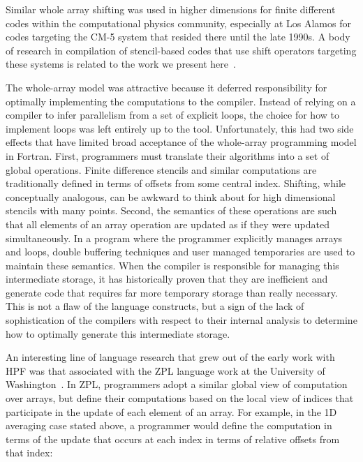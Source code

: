 Similar whole array shifting was used in higher dimensions for finite
different codes within the computational physics community, especially
at Los Alamos for codes targeting the CM-5 system that resided there until the
late 1990s.  A body of research in compilation of stencil-based codes
that use shift operators targeting these systems is related to the
work we present here~\cite{stencil-compiler}.

The whole-array model was attractive because it deferred
responsibility for optimally implementing the computations to the
compiler.  Instead of relying on a compiler to infer parallelism from
a set of explicit loops, the choice for how to implement loops was
left entirely up to the tool.  Unfortunately, this had two side
effects that have limited broad acceptance of the whole-array
programming model in Fortran.  First, programmers must translate their
algorithms into a set of global operations.  Finite difference
stencils and similar computations are traditionally defined in terms
of offsets from some central index.  Shifting, while conceptually
analogous, can be awkward to think about for high dimensional stencils
with many points.  Second, the semantics of these operations are such
that all elements of an array operation are updated as if they were
updated simultaneously.  In a program where the programmer explicitly
manages arrays and loops, double buffering techniques and user managed
temporaries are used to maintain these semantics.  When the compiler
is responsible for managing this intermediate storage, it has
historically proven that they are inefficient and generate code that
requires far more temporary storage than really necessary.  This is
not a flaw of the language constructs, but a sign of the lack of
sophistication of the compilers with respect to their internal
analysis to determine how to optimally generate this intermediate
storage.

An interesting line of language research that grew out of the early work
with HPF was that associated with the ZPL language work at the University
of Washington~\cite{chamberlain04zpl}.  In ZPL, programmers adopt a similar
global view of computation over arrays, but define their computations based
on the local view of indices that participate in the update of each element of
an array.  For example, in the 1D averaging case stated above, a programmer would
define the computation in terms of the update that occurs at each index in terms
of relative offsets from that index:
